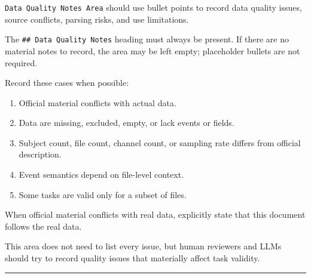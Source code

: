 \begin{tcolorbox}
\noindent \texttt{Data Quality Notes Area} should use bullet points to record data quality issues, source conflicts, parsing risks, and use limitations.\par\smallskip
\noindent The \texttt{\#\# Data Quality Notes} heading must always be present. If there are no material notes to record, the area may be left empty; placeholder bullets are not required.\par\smallskip

\smallskip{}\par\smallskip

\noindent Record these cases when possible:\par\smallskip

\begin{enumerate}[leftmargin=1.5em,noitemsep,topsep=2pt]
\item Official material conflicts with actual data.
\item Data are missing, excluded, empty, or lack events or fields.
\item Subject count, file count, channel count, or sampling rate differs from official description.
\item Event semantics depend on file-level context.
\item Some tasks are valid only for a subset of files.
\end{enumerate}

\smallskip{}\par\smallskip

\noindent When official material conflicts with real data, explicitly state that this document follows the real data.\par\smallskip

\smallskip{}\par\smallskip

\noindent This area does not need to list every issue, but human reviewers and LLMs should try to record quality issues that materially affect task validity.\par\smallskip

\medskip{}
\par\nopagebreak\noindent\rule{\linewidth}{0.4pt}\par\smallskip

\smallskip{}\par\smallskip


\end{tcolorbox}
